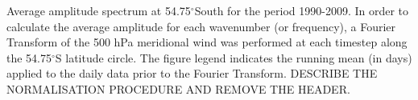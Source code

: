\label{fig:fourier_spectrum}
Average amplitude spectrum at 54.75$^{\circ}$South for the period 1990-2009. In order to calculate the average amplitude for each wavenumber (or frequency), a Fourier Transform of the 500 hPa meridional wind was performed at each timestep along the 54.75$^{\circ}$S latitude circle. The figure legend indicates the running mean (in days) applied to the daily data prior to the Fourier Transform. DESCRIBE THE NORMALISATION PROCEDURE AND REMOVE THE HEADER.  